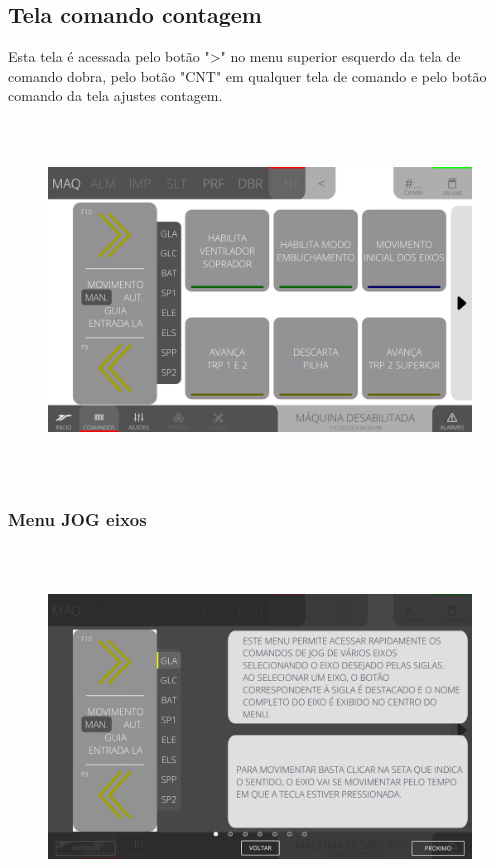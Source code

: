 \thispagestyle{fancy}
\vspace*{\fill}
\subsection{Tela comando contagem}
 Esta tela é acessada pelo botão "\textgreater" no menu superior esquerdo da tela de comando dobra, pelo botão "CNT" em qualquer tela de comando e pelo botão comando da tela ajustes contagem.
\begin{figure}[h]
  \centering
  \includegraphics[width=576px,height=360px]{src/imagesFlexo/08-count/commands/e-Tela-Principal.png}
\end{figure}

\newpage
\thispagestyle{fancy}
\vspace*{\fill}
\subsubsection{\small{Menu JOG eixos}}
\begin{figure}[h]
  \centering
  \includegraphics[width=576px,height=360px]{src/imagesFlexo/08-count/commands/e-1.png}
\end{figure}
\vspace*{\fill}

